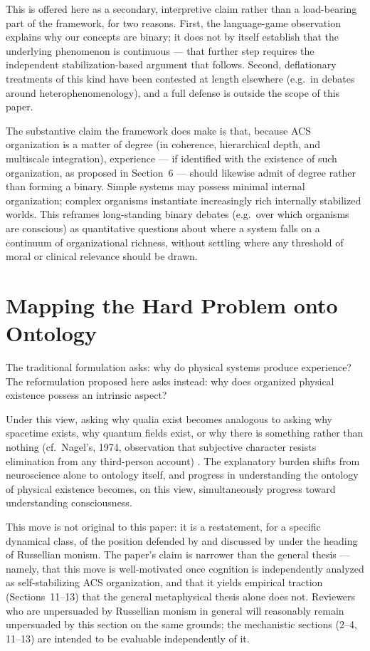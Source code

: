 \documentclass[11pt]{article}
\begin{document}
This is offered here as a secondary, interpretive claim rather than a load-bearing part of the framework, for two reasons. First, the language-game observation explains why our concepts are binary; it does not by itself establish that the underlying phenomenon is continuous --- that further step requires the independent stabilization-based argument that follows. Second, deflationary treatments of this kind have been contested at length elsewhere (e.g.\ in debates around heterophenomenology), and a full defense is outside the scope of this paper.

The substantive claim the framework does make is that, because ACS organization is a matter of degree (in coherence, hierarchical depth, and multiscale integration), experience --- if identified with the existence of such organization, as proposed in Section~6 --- should likewise admit of degree rather than forming a binary. Simple systems may possess minimal internal organization; complex organisms instantiate increasingly rich internally stabilized worlds. This reframes long-standing binary debates (e.g.\ over which organisms are conscious) as quantitative questions about where a system falls on a continuum of organizational richness, without settling where any threshold of moral or clinical relevance should be drawn.

\section{Mapping the Hard Problem onto Ontology}

The traditional formulation asks: why do physical systems produce experience? The reformulation proposed here asks instead: why does organized physical existence possess an intrinsic aspect?

Under this view, asking why qualia exist becomes analogous to asking why spacetime exists, why quantum fields exist, or why there is something rather than nothing (cf.\ Nagel's, 1974, observation that subjective character resists elimination from any third-person account) \citep*{nagel1974}. The explanatory burden shifts from neuroscience alone to ontology itself, and progress in understanding the ontology of physical existence becomes, on this view, simultaneously progress toward understanding consciousness.

This move is not original to this paper: it is a restatement, for a specific dynamical class, of the position defended by \citet*{strawson2006} and discussed by \citet*{chalmers2013} under the heading of Russellian monism. The paper's claim is narrower than the general thesis --- namely, that this move is well-motivated once cognition is independently analyzed as self-stabilizing ACS organization, and that it yields empirical traction (Sections~11--13) that the general metaphysical thesis alone does not. Reviewers who are unpersuaded by Russellian monism in general will reasonably remain unpersuaded by this section on the same grounds; the mechanistic sections (2--4, 11--13) are intended to be evaluable independently of it.
\end{document}
